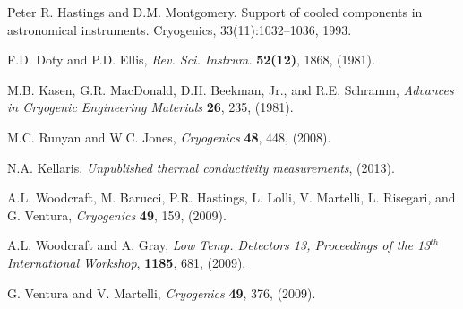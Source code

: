 \documentclass[final]{svjour2}
\begin{document}
\begin{thebibliography}{99}

Peter R. Hastings and D.M. Montgomery. Support of cooled components in astronomical instruments. Cryogenics, 33(11):1032–1036, 1993.


F.D. Doty and P.D. Ellis, {\it Rev. Sci. Instrum.} \textbf{52(12)}, 1868, (1981).

M.B. Kasen, G.R. MacDonald, D.H. Beekman, Jr., and R.E. Schramm, {\it Advances in Cryogenic Engineering Materials} \textbf{26}, 235, (1981). 



M.C. Runyan and W.C. Jones, {\it Cryogenics} \textbf{48}, 448, (2008).

N.A. Kellaris. {\it Unpublished thermal conductivity measurements}, (2013).

A.L. Woodcraft, M. Barucci, P.R. Hastings, L. Lolli, V. Martelli, L. Risegari, and G. Ventura, {\it Cryogenics} \textbf{49}, 159, (2009).

A.L. Woodcraft and A. Gray, {\it Low Temp. Detectors 13, Proceedings of the 13$^{th}$ International Workshop}, \textbf{1185}, 681, (2009).

G. Ventura and V. Martelli, {\it Cryogenics} \textbf{49}, 376, (2009).

\end{thebibliography}
\end{document}
